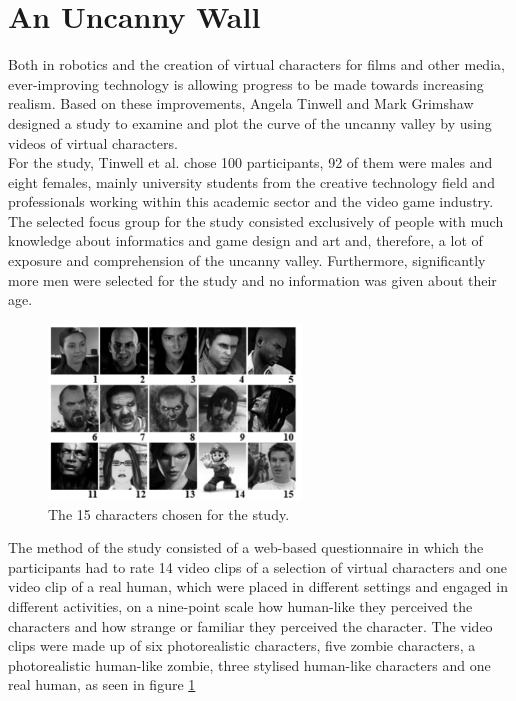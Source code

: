 \section{An Uncanny Wall}
Both in robotics and the creation of virtual characters for films and other media, ever-improving technology is allowing progress to be made towards increasing realism. Based on these improvements, Angela Tinwell and Mark Grimshaw \cite{uncanny_wall} designed a study to examine and plot the curve of the uncanny valley by using videos of virtual characters.\\
For the study, Tinwell et al. chose 100 participants, 92 of them were males and eight females, mainly university students from the creative technology field and professionals working within this academic sector and the video game industry. The selected focus group for the study consisted exclusively of people with much knowledge about informatics and game design and art and, therefore, a lot of exposure and comprehension of the uncanny valley. Furthermore, significantly more men were selected for the study and no information was given about their age.\\%
\begin{figure} %
    \centering
    \includegraphics[width=0.6\textwidth]{graphics/uncanny_wall.png}
    \caption{The 15 characters chosen for the study.}
    \label{fig:uncannyWall}
\end{figure}
The method of the study consisted of a web-based questionnaire in which the participants had to rate 14 video clips of a selection of virtual characters and one video clip of a real human, which were placed in different settings and engaged in different activities, on a nine-point scale how human-like they perceived the characters and how strange or familiar they perceived the character. The video clips were made up of six photorealistic characters, five zombie characters, a photorealistic human-like zombie, three stylised human-like characters and one real human, as seen in figure \ref{fig:uncannyWall}\\
